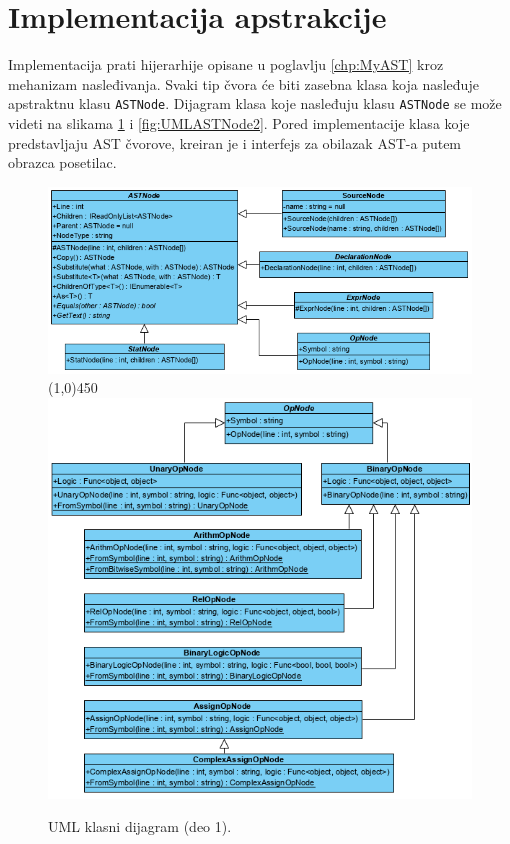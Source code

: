 \section{Implementacija apstrakcije}
\label{sec:ImplementationMyAST}

Implementacija prati hijerarhije opisane u poglavlju \ref{chp:MyAST} kroz mehanizam nasleđivanja. Svaki tip čvora će biti zasebna klasa koja nasleđuje apstraktnu klasu \texttt{ASTNode}. Dijagram klasa koje nasleđuju klasu \texttt{ASTNode} se može videti na slikama \ref{fig:UMLASTNode1} i \ref{fig:UMLASTNode2}. Pored implementacije klasa koje predstavljaju AST čvorove, kreiran je i interfejs za obilazak AST-a putem obrazca posetilac.

\begin{figure}[h!]
\centering
\includegraphics[scale=0.7]{images/uml/ASTNode.png}
\line(1,0){450}\\
\includegraphics[scale=0.7]{images/uml/OperatorNode.png}
\caption{UML klasni dijagram (deo 1).}
\label{fig:UMLASTNode1}
\end{figure}

